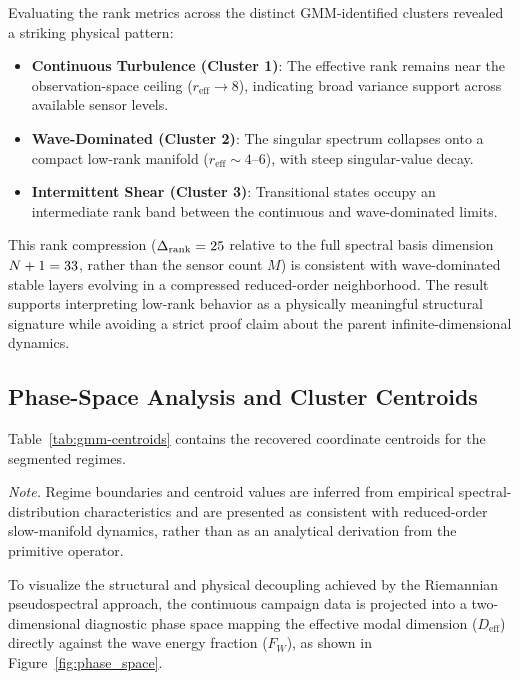 Evaluating the rank metrics across the distinct GMM-identified clusters revealed a striking physical pattern:
\begin{itemize}
  \item \textbf{Continuous Turbulence (Cluster 1)}: The effective rank remains near the observation-space ceiling ($r_{\mathrm{eff}} \rightarrow 8$), indicating broad variance support across available sensor levels.
  \item \textbf{Wave-Dominated (Cluster 2)}: The singular spectrum collapses onto a compact low-rank manifold ($r_{\mathrm{eff}} \sim 4$--$6$), with steep singular-value decay.
  \item \textbf{Intermittent Shear (Cluster 3)}: Transitional states occupy an intermediate rank band between the continuous and wave-dominated limits.
\end{itemize}

This rank compression ($\Delta_{\mathrm{rank}} = 25$ relative to the full spectral basis dimension $N+1=33$, rather than the sensor count $M$) is consistent with wave-dominated stable layers evolving in a compressed reduced-order neighborhood. The result supports interpreting low-rank behavior as a physically meaningful structural signature while avoiding a strict proof claim about the parent infinite-dimensional dynamics.


\subsection{Phase-Space Analysis and Cluster Centroids}
\label{sec:results:phase_space}

Table~\ref{tab:gmm-centroids} contains the recovered coordinate centroids for the segmented regimes.


\noindent\textit{Note.} Regime boundaries and centroid values are inferred from empirical spectral-distribution characteristics and are presented as consistent with reduced-order slow-manifold dynamics, rather than as an analytical derivation from the primitive operator.

To visualize the structural and physical decoupling achieved by the Riemannian pseudospectral approach, the continuous campaign data is projected into a two-dimensional diagnostic phase space mapping the effective modal dimension ($D_{\mathrm{eff}}$) directly against the wave energy fraction ($F_W$), as shown in Figure~\ref{fig:phase_space}.

